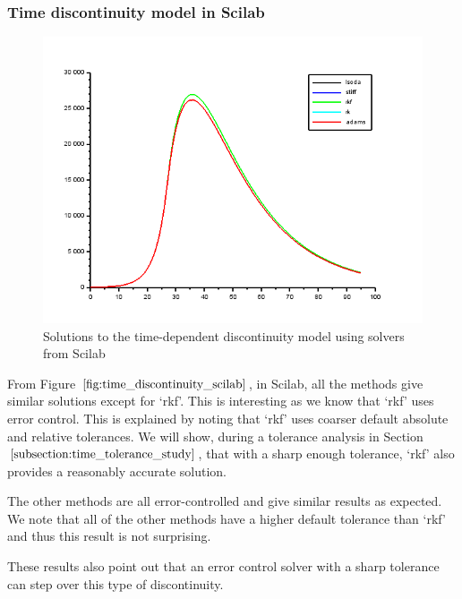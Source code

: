 \subsubsection{Time discontinuity model in Scilab}
\begin{figure}[H]
\centering
\includegraphics[width=0.7\linewidth]{./figures/time_discontinuity_scilab}
\caption{Solutions to the time-dependent discontinuity model using solvers from Scilab}
\label{fig:time_discontinuity_scilab}
\end{figure}
From Figure $\ref{fig:time_discontinuity_scilab}$, in Scilab, all the methods give similar solutions except for `rkf'. This is interesting as we know that `rkf' uses error control. This is explained by noting that `rkf' uses coarser default absolute and relative tolerances. We will show, during a tolerance analysis in Section $\ref{subsection:time_tolerance_study}$, that with a sharp enough tolerance, `rkf' also provides a reasonably accurate solution.

The other methods are all error-controlled and give similar results as expected. We note that all of the other methods have a higher default tolerance than `rkf' and thus this result is not surprising.

These results also point out that an error control solver with a sharp tolerance can step over this type of discontinuity.

